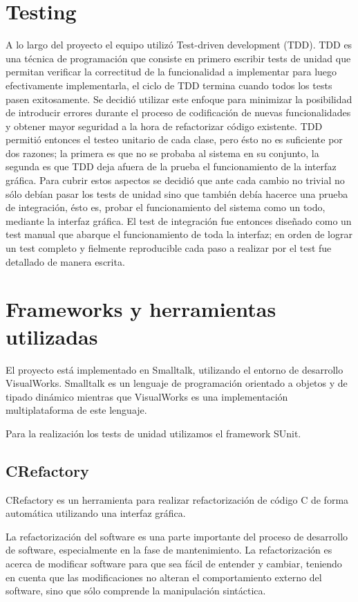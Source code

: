 \documentclass[a4paper,oneside,12pt]{article}
\begin{document}
\section{Testing}
\label{sec:testing}
A lo largo del proyecto el equipo utiliz\'o Test-driven development (TDD). TDD es una t\'ecnica de programaci\'on que consiste en primero escribir tests de unidad que permitan verificar la correctitud de la funcionalidad a implementar para luego efectivamente implementarla, el ciclo de TDD termina cuando todos los tests pasen exitosamente. Se decidi\'o utilizar este enfoque para minimizar la posibilidad de introducir errores durante el proceso de codificaci\'on de nuevas funcionalidades y obtener mayor seguridad a la hora de refactorizar c\'odigo existente.
TDD permiti\'o entonces el testeo unitario de cada clase, pero \'esto no es suficiente por dos razones; la primera es que no se probaba al sistema en su conjunto, la segunda es que TDD deja afuera de la prueba el funcionamiento de la interfaz gr\'afica. Para cubrir estos aspectos se decidi\'o que ante cada cambio no trivial no s\'olo deb\'ian pasar los tests de unidad sino que tambi\'en deb\'ia hacerce una prueba de integraci\'on, \'esto es, probar el funcionamiento del sistema como un todo, mediante la interfaz gr\'afica. El test de integraci\'on fue entonces diseñado como un test manual que abarque el funcionamiento de toda la interfaz; en orden de lograr un test completo y fielmente reproducible cada paso a realizar por el test fue detallado de manera escrita.

\section{Frameworks y herramientas utilizadas}
\label{sec:frameworks_and_tools}
El proyecto est\'a implementado en Smalltalk, utilizando el entorno de desarrollo VisualWorks. Smalltalk es un lenguaje de programaci\'on orientado a objetos y de tipado din\'amico mientras que VisualWorks es una implementaci\'on multiplataforma de este lenguaje.

Para la realizaci\'on los tests de unidad utilizamos el framework SUnit.

\subsection{CRefactory}
CRefactory es un herramienta para realizar refactorizaci\'on de c\'odigo C de forma autom\'atica utilizando una interfaz gr\'afica.

La refactorización del software es una parte importante del proceso de desarrollo de software, especialmente en la fase de mantenimiento. La refactorización es acerca de modificar software para que sea fácil de entender y cambiar, teniendo en cuenta que las modificaciones no alteran el comportamiento externo del software, sino que sólo comprende la manipulación sintáctica.
\end{document}
